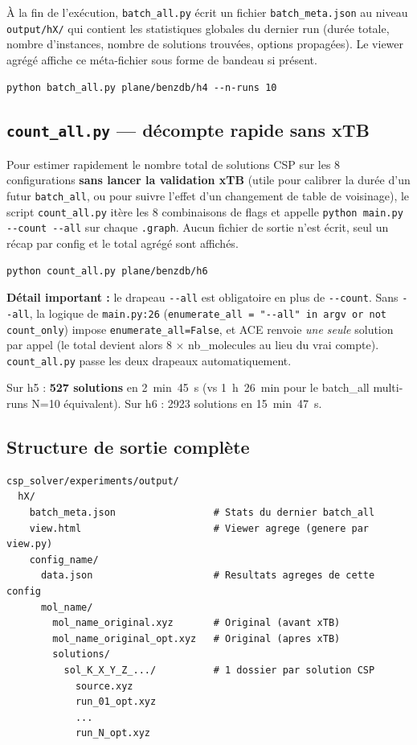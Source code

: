 À la fin de l'exécution, \texttt{batch\_all.py} écrit un fichier \texttt{batch\_meta.json}
au niveau \texttt{output/hX/} qui contient les statistiques globales du dernier run (durée
totale, nombre d'instances, nombre de solutions trouvées, options propagées). Le viewer
agrégé affiche ce méta-fichier sous forme de bandeau si présent.

\begin{lstlisting}[style=benzai]
python batch_all.py plane/benzdb/h4 --n-runs 10
\end{lstlisting}

\subsection{\texttt{count\_all.py} — décompte rapide sans xTB}


Pour estimer rapidement le nombre total de solutions CSP sur les 8 configurations
\textbf{sans lancer la validation xTB} (utile pour calibrer la durée d'un futur
\texttt{batch\_all}, ou pour suivre l'effet d'un changement de table de voisinage),
le script \texttt{count\_all.py} itère les 8 combinaisons de flags et appelle
\texttt{python main.py -{}-count -{}-all} sur chaque \texttt{.graph}. Aucun fichier
de sortie n'est écrit, seul un récap par config et le total agrégé sont affichés.

\begin{lstlisting}[style=benzai]
python count_all.py plane/benzdb/h6
\end{lstlisting}

\textbf{Détail important :} le drapeau \texttt{-{}-all} est obligatoire en plus de
\texttt{-{}-count}. Sans \texttt{-{}-all}, la logique de \texttt{main.py:26}
(\texttt{enumerate\_all = "-{}-all" in argv or not count\_only}) impose
\texttt{enumerate\_all=False}, et ACE renvoie \emph{une seule} solution par appel
(le total devient alors 8 $\times$ nb\_molecules au lieu du vrai compte).
\texttt{count\_all.py} passe les deux drapeaux automatiquement.

Sur h5 : \textbf{527 solutions} en 2~min~45~s (vs 1~h~26~min pour le batch\_all
multi-runs N=10 équivalent). Sur h6 : 2923 solutions en 15~min~47~s.

\subsection{Structure de sortie complète}

\begin{lstlisting}[style=benzai]
csp_solver/experiments/output/
  hX/
    batch_meta.json                 # Stats du dernier batch_all
    view.html                       # Viewer agrege (genere par view.py)
    config_name/
      data.json                     # Resultats agreges de cette config
      mol_name/
        mol_name_original.xyz       # Original (avant xTB)
        mol_name_original_opt.xyz   # Original (apres xTB)
        solutions/
          sol_K_X_Y_Z_.../          # 1 dossier par solution CSP
            source.xyz
            run_01_opt.xyz
            ...
            run_N_opt.xyz
\end{lstlisting}

